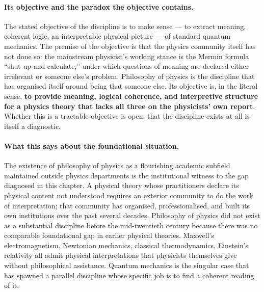 \paragraph{Its objective and the paradox the objective contains.}
The stated objective of the discipline is to make sense --- to extract meaning, coherent logic, an interpretable physical picture --- of standard quantum mechanics. The premise of the objective is that the physics community itself has not done so: the mainstream physicist's working stance is the Mermin formula ``shut up and calculate,'' under which questions of meaning are declared either irrelevant or someone else's problem. Philosophy of physics is the discipline that has organised itself around being that someone else. Its objective is, in the literal sense, \textbf{to provide meaning, logical coherence, and interpretive structure for a physics theory that lacks all three on the physicists' own report}. Whether this is a tractable objective is open; that the discipline exists at all is itself a diagnostic.

\paragraph{What this says about the foundational situation.}
The existence of philosophy of physics as a flourishing academic subfield maintained outside physics departments is the institutional witness to the gap diagnosed in this chapter. A physical theory whose practitioners declare its physical content not understood requires an exterior community to do the work of interpretation; that community has organised, professionalised, and built its own institutions over the past several decades. Philosophy of physics did not exist as a substantial discipline before the mid-twentieth century because there was no comparable foundational gap in earlier physical theories. Maxwell's electromagnetism, Newtonian mechanics, classical thermodynamics, Einstein's relativity all admit physical interpretations that physicists themselves give without philosophical assistance. Quantum mechanics is the singular case that has spawned a parallel discipline whose specific job is to find a coherent reading of it.

